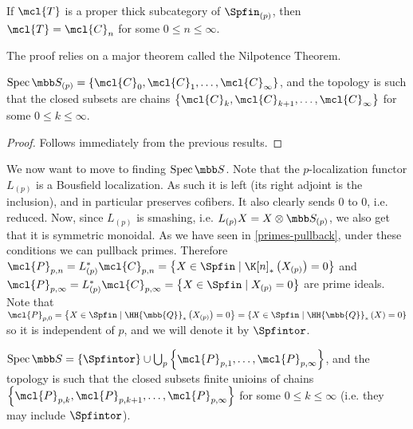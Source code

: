 \begin{theorem}
	If $\mcl{T}$ is a proper thick subcategory of $\Spfin_{\left(p\right)}$, then $\mcl{T} = \mcl{C}_n$ for some $0 \leq n \leq \infty$.
\end{theorem}

\begin{remark}
	The proof relies on a major theorem called the Nilpotence Theorem.
\end{remark}

\begin{corollary}
	$\spec \SS_{\left(p\right)} = \left\{ \mcl{C}_0, \mcl{C}_1, \dotsc, \mcl{C}_\infty \right\}$,
	and the topology is such that the closed subsets are chains
	$\left\{ \mcl{C}_k, \mcl{C}_{k+1}, \dotsc, \mcl{C}_\infty \right\}$
	for some $0 \leq k \leq \infty$.
\end{corollary}

\begin{proof}
	Follows immediately from the previous results.
\end{proof}

We now want to move to finding $\spec \SS$.
Note that the $p$-localization functor $L_{\left(p\right)}$ is a Bousfield localization.
As such it is left (its right adjoint is the inclusion), and in particular preserves cofibers.
It also clearly sends $0$ to $0$, i.e. reduced.
Now, since $L_{\left(p\right)}$ is smashing, i.e. $L_{\left(p\right)} X = X \otimes \SS_{\left(p\right)}$, we also get that it is symmetric monoidal.
As we have seen in \ref{primes-pullback}, under these conditions we can pullback primes.
Therefore
$
\mcl{P}_{p, n}
= L_{\left(p\right)}^* \mcl{C}_{p, n}
= \left\{
	X \in \Spfin
	\mid
	\K[n]_*\left(X_{\left(p\right)}\right) = 0
\right\}
$
and
$
\mcl{P}_{p, \infty}
= L_{\left(p\right)}^* \mcl{C}_{p, \infty}
= \left\{
	X \in \Spfin
	\mid
	X_{\left(p\right)} = 0
\right\}
$
are prime ideals.
Note that
$
\mcl{P}_{p, 0}
= \left\{
	X \in \Spfin
	\mid
	{\HH{\mbb{Q}}}_*\left(X_{\left(p\right)}\right) = 0
\right\}
= \left\{
	X \in \Spfin
	\mid
	{\HH{\mbb{Q}}}_*\left(X\right) = 0
\right\}
$
so it is independent of $p$, and we will denote it by $\Spfintor$.

\begin{theorem}[\todo{explain/reference}]
	$
	\spec \SS
	= \left\{\Spfintor\right\}
	\cup \bigcup_p \left\{\mcl{P}_{p, 1}, \dotsc, \mcl{P}_{p, \infty}\right\}
	$,
	and the topology is such that the closed subsets finite unioins of chains
	$\left\{ \mcl{P}_{p, k}, \mcl{P}_{p, k+1}, \dotsc, \mcl{P}_{p, \infty} \right\}$
	for some $0 \leq k \leq \infty$ (i.e. they may include $\Spfintor$).
\end{theorem}



